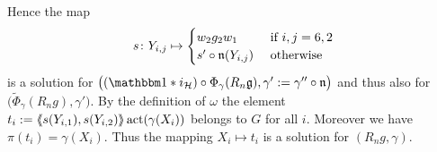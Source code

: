 \documentclass[a4paper,11pt]{amsart}
\begin{document}
Hence the map 
\[s \colon Y_{i,j}\mapsto \begin{cases}
w_2 g_2w_1 &\textup{ if } 
{i,j}= 6,2 \\
s'\circ \mathfrak n (Y_{i,j}) &\textup{ otherwise}
\end{cases}
\]
is a solution for $\big((\id*i_{
\mathcal{H}})\circ\Phi_\gamma(R_n\mathfrak g),
\gamma':=\gamma''\circ \mathfrak n\big)$ and thus also for
$\big(\tilde\Phi_\gamma(R_n g),\gamma'\big)$.
By the definition of $\omega$ the element
$t_i:=\langle\negthickspace\langle s(Y_{i,1}),s(Y_{i,2})\rangle\negthickspace\rangle\operatorname{act}(\gamma(X_i))$ belongs to $G$
for all $i$. Moreover we have $\pi(t_i)=\gamma(X_i)$. Thus the mapping
$X_i\mapsto t_i$
is a solution for $(R_ng,\gamma)$.
\end{document}
